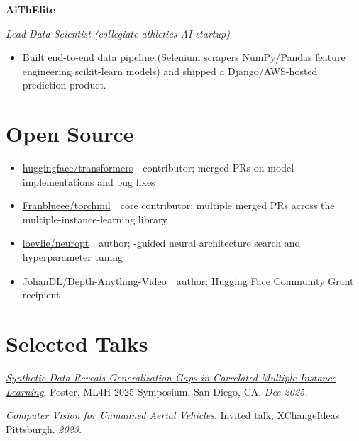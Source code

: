 \documentclass[10pt,letterpaper]{article}
\newcommand{\monofam}{\ttfamily}
\newcommand{\role}[2]{%
  \filbreak%
  \par\vspace{1pt}%
  \noindent\textbf{#1}\marginnote{#2}\par\nopagebreak}
\newcommand{\sub}[1]{\noindent\textit{\footnotesize\color{meta} #1}\par\nopagebreak}
\newcommand{\acro}[1]{\textls[80]{#1}}
\newenvironment{publist}{%
  \begin{list}{}{%
    \setlength{\leftmargin}{1.2em}%
    \setlength{\itemindent}{-1.2em}%
    \setlength{\itemsep}{2pt}%
    \setlength{\parsep}{0pt}%
    \setlength{\topsep}{1pt}%
  }%
}{\end{list}}
\begin{document}
\role{AiThElite}{Dec 2020 \textendash{} May 2021}
\sub{Lead Data Scientist (collegiate-athletics AI startup)}
\begin{itemize}
  \item Built end-to-end data pipeline (Selenium scrapers \textrightarrow{} NumPy/Pandas feature engineering \textrightarrow{} scikit-learn models) and shipped a Django/AWS-hosted prediction product.
\end{itemize}

\section{Open Source}

\begin{itemize}
  \item \href{https://github.com/huggingface/transformers}{\monofam huggingface/transformers} \,\textemdash\, contributor; merged PRs on model implementations and bug fixes
  \item \href{https://github.com/Franblueee/torchmil}{\monofam Franblueee/torchmil} \,\textemdash\, core contributor; multiple merged PRs across the multiple-instance-learning library
  \item \href{https://github.com/loevlie/neuropt}{\monofam loevlie/neuropt} \,\textemdash\, author; \acro{LLM}-guided neural architecture search and hyperparameter tuning
  \item \href{https://huggingface.co/spaces/JohanDL/Depth-Anything-Video}{\monofam JohanDL/Depth-Anything-Video} \,\textemdash\, author; Hugging Face Community Grant recipient
\end{itemize}

\section{Selected Talks}

\begin{publist}
\item \href{https://drive.google.com/file/d/1Z6lkTsqYSIzOqgM53qONW2riQhVM5R0W/view?usp=sharing}{\textit{Synthetic Data Reveals Generalization Gaps in Correlated Multiple Instance Learning}}. Poster, ML4H 2025 Symposium, San Diego, CA. \textit{Dec 2025.}

\item \href{https://xchangepgh2023.sched.com/event/1LdC7/an-interactive-exploration-of-computer-vision-for-unmanned-aerial-vehicles-uavs}{\textit{Computer Vision for Unmanned Aerial Vehicles}}. Invited talk, XChangeIdeas Pittsburgh. \textit{2023.}
\end{publist}
\end{document}
